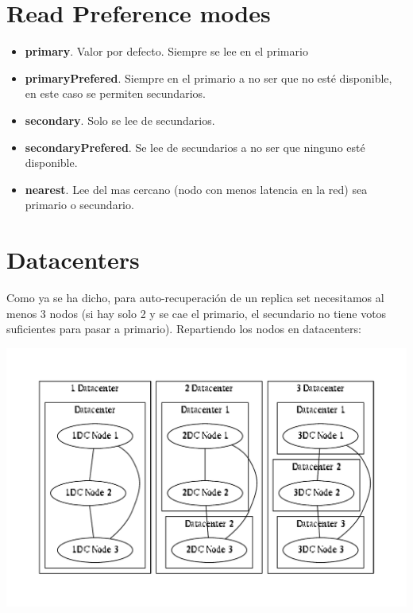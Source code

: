 \documentclass[a4paper,10pt,english]{sphinxmanual}
\begin{document}
\section{Read Preference modes}
\label{contents/replicaSet:read-preference-modes}\begin{itemize}
\item {} 
\textbf{primary}. Valor por defecto. Siempre se lee en el primario

\item {} 
\textbf{primaryPrefered}. Siempre en el primario a no ser que no esté disponible, en este caso se permiten secundarios.

\item {} 
\textbf{secondary}. Solo se lee de secundarios.

\item {} 
\textbf{secondaryPrefered}. Se lee de secundarios a no ser que ninguno esté disponible.

\item {} 
\textbf{nearest}. Lee del mas cercano (nodo con menos latencia en la red) sea primario o secundario.

\end{itemize}


\section{Datacenters}
\label{contents/replicaSet:datacenters}
Como ya se ha dicho, para auto-recuperación de un replica set necesitamos al menos 3 nodos (si hay solo 2 y se cae el primario, el secundario no tiene votos suficientes para pasar a primario). Repartiendo los nodos en datacenters:

\includegraphics{graphviz-7e3673d918e91bd6856d148078d48699ab39ecdb.pdf}
\end{document}
